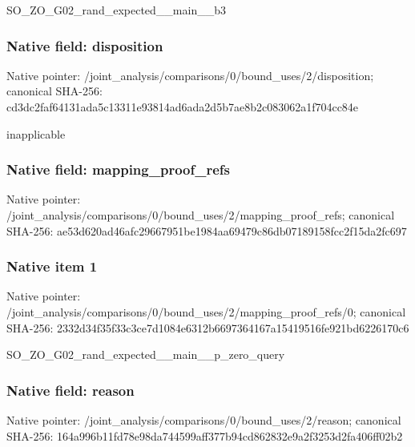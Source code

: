 \documentclass[10pt,a4paper]{article}
\begin{document}
\begingroup\raggedright\sloppy SO\_\allowbreak{}ZO\_\allowbreak{}G02\_\allowbreak{}rand\_\allowbreak{}expected\_\allowbreak{}\_\allowbreak{}main\_\allowbreak{}\_\allowbreak{}b3\par\endgroup

\subsubsection{Native field: disposition}
Native pointer: /joint\_\allowbreak{}analysis/comparisons/0/bound\_\allowbreak{}uses/2/disposition; canonical SHA-256: cd3dc2faf64131ada5c13311e93814ad6ada2d5b7ae8b2c083062a1f704cc84e

\begingroup\raggedright\sloppy inapplicable\par\endgroup

\subsubsection{Native field: mapping\_\allowbreak{}proof\_\allowbreak{}refs}
Native pointer: /joint\_\allowbreak{}analysis/comparisons/0/bound\_\allowbreak{}uses/2/mapping\_\allowbreak{}proof\_\allowbreak{}refs; canonical SHA-256: ae53d620ad46afc29667951be1984aa69479c86db07189158fcc2f15da2fc697

\subsubsection{Native item 1}
Native pointer: /joint\_\allowbreak{}analysis/comparisons/0/bound\_\allowbreak{}uses/2/mapping\_\allowbreak{}proof\_\allowbreak{}refs/0; canonical SHA-256: 2332d34f35f33c3ce7d1084e6312b6697364167a15419516fe921bd6226170c6

\begingroup\raggedright\sloppy SO\_\allowbreak{}ZO\_\allowbreak{}G02\_\allowbreak{}rand\_\allowbreak{}expected\_\allowbreak{}\_\allowbreak{}main\_\allowbreak{}\_\allowbreak{}p\_\allowbreak{}zero\_\allowbreak{}query\par\endgroup

\subsubsection{Native field: reason}
Native pointer: /joint\_\allowbreak{}analysis/comparisons/0/bound\_\allowbreak{}uses/2/reason; canonical SHA-256: 164a996b11fd78e98da744599aff377b94cd862832e9a2f3253d2fa406ff02b2
\end{document}
